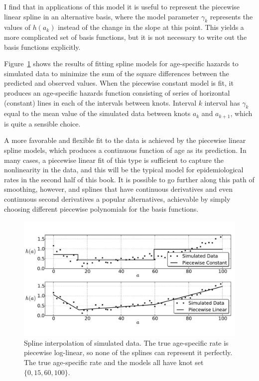I find that in applications of this model it is useful to represent
the piecewise linear spline in an alternative basis, where the model
parameter $\gamma_k$ represents the values of $h(a_k)$ instead of the
change in the slope at this point.  This yields a more complicated set
of basis functions, but it is not necessary to write out the basis
functions explicitly.


Figure~\ref{splines_fig} shows the results of fitting spline models
for age-specific hazards to simulated data to minimize the sum of the
square differences between the predicted and observed values.  When
the piecewise constant model is fit, it produces an age-specific
hazards function consisting of series of horizontal (constant) lines
in each of the intervals between knots.  Interval $k$ interval has
$\gamma_k$ equal to the mean value of the simulated data between knots
$a_k$ and $a_{k+1}$, which is quite a sensible choice.

A more favorable and flexible fit to the data is achieved by the
piecewise linear spline models, which produces a continuous function
of age as its prediction. In many cases, a piecewise linear fit of
this type is sufficient to capture the nonlinearity in the data, and
this will be the typical model for epidemiological rates in the second
half of this book.  It is possible to go further along this path of
smoothing, however, and splines that have continuous derivatives and
even continuous second derivatives a popular alternatives, achievable
by simply choosing different piecewise polynomials for the basis
functions.


\begin{figure}[h]
\begin{center}
\includegraphics[width=\textwidth]{splines-fig.pdf}
\caption{Spline interpolation of simulated data. The true age-specific
  rate is piecewise log-linear, so none of the splines can represent
  it perfectly. The true age-specific rate and the models all have
  knot set $\{0, 15, 60, 100\}$.}
\label{splines_fig}
\end{center}
\end{figure}


